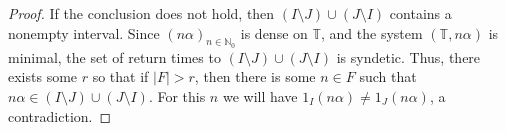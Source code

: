 \documentclass[11pt,reqno]{amsart}
\theoremstyle{definition}
\theoremstyle{plain}
\newcommand{\Z}{\mathbb{Z}}
\newcommand{\N}{\mathbb{N}}
\newcommand{\T}{\mathbb{T}}
\newcommand{\AuthornoteA}[2]{{\sf\small\color{magenta}{[#1: #2]}}}
\newcommand{\AuthornoteC}[2]{{\sf\small\color{cyan}{[#1: #2]}}}
\newcommand{\Anote}{\AuthornoteA{A}}
\newcommand{\Cnote}{\AuthornoteC{C}}
\begin{document}
\begin{proof}



If the conclusion does not hold, then $(I \setminus J) \cup (J \setminus I)$ contains a nonempty interval. Since $(n \alpha)_{n \in \N_0}$ is dense on $\T$, and the system $(\T, n\alpha)$ is minimal, the set of return times to $(I \setminus J) \cup (J \setminus I)$ is syndetic. Thus, there exists some $r$ so that if $|F| > r$, then there is some $n \in F$ such that $n \alpha \in (I \setminus J) \cup (J \setminus I)$.   For this $n$ we will have $1_I(n \alpha) \neq 1_J(n \alpha)$, a contradiction.
\end{proof}
\end{document}

